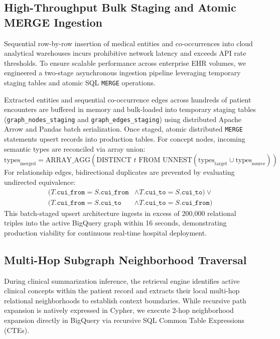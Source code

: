 \documentclass[11pt, a4paper]{article}
\begin{document}
\subsection{High-Throughput Bulk Staging and Atomic MERGE Ingestion}
Sequential row-by-row insertion of medical entities and co-occurrences into cloud analytical warehouses incurs prohibitive network latency and exceeds API rate thresholds. To ensure scalable performance across enterprise EHR volumes, we engineered a two-stage asynchronous ingestion pipeline leveraging temporary staging tables and atomic SQL \texttt{MERGE} operations.

Extracted entities and sequential co-occurrence edges across hundreds of patient encounters are buffered in memory and bulk-loaded into temporary staging tables (\texttt{graph\_nodes\_staging} and \texttt{graph\_edges\_staging}) using distributed Apache Arrow and Pandas batch serialization. Once staged, atomic distributed \texttt{MERGE} statements upsert records into production tables. For concept nodes, incoming semantic types are reconciled via array union:
\begin{equation}
  \text{types}_{\text{merged}} = \text{ARRAY\_AGG}(\text{DISTINCT } t \text{ FROM UNNEST}(\text{types}_{\text{target}} \cup \text{types}_{\text{source}}))
\end{equation}
For relationship edges, bidirectional duplicates are prevented by evaluating undirected equivalence:
\begin{equation}
  \begin{aligned}
    (T.\texttt{cui\_from} = S.\texttt{cui\_from} & \land T.\texttt{cui\_to} = S.\texttt{cui\_to}) \lor \\
    (T.\texttt{cui\_from} = S.\texttt{cui\_to} & \land T.\texttt{cui\_to} = S.\texttt{cui\_from})
  \end{aligned}
\end{equation}
This batch-staged upsert architecture ingests in excess of 200,000 relational triples into the active BigQuery graph within 16 seconds, demonstrating production viability for continuous real-time hospital deployment.

\subsection{Multi-Hop Subgraph Neighborhood Traversal}
During clinical summarization inference, the retrieval engine identifies active clinical concepts within the patient record and extracts their local multi-hop relational neighborhoods to establish context boundaries. While recursive path expansion is natively expressed in Cypher, we execute 2-hop neighborhood expansion directly in BigQuery via recursive SQL Common Table Expressions (CTEs).
\end{document}
